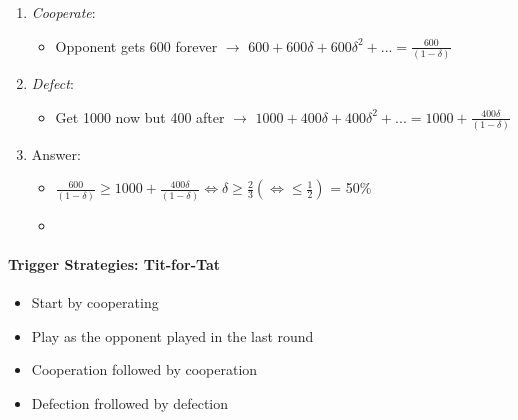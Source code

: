 \documentclass[11pt, english]{article}
\begin{document}
	\begin{enumerate}                                      
        \setlength\itemsep{0cm}
		\item \textit{Cooperate}:
		\begin{itemize}
			\item Opponent gets 600 forever $\rightarrow$ $600+600\delta+600\delta^2+...=\frac{600}{(1-\delta)}$
		\end{itemize}
		\item \textit{Defect}:
		\begin{itemize}                            
			\item Get 1000 now but 400 after $\rightarrow$ $1000+400\delta+400\delta^2+...=1000+\frac{400\delta}{(1-\delta)}$
                \end{itemize}
		\item Answer:
		\begin{itemize}                            
			\item $\frac{600}{(1-\delta)}\ge1000+\frac{400\delta}{(1-\delta)}\Leftrightarrow\delta\ge\frac{2}{3}(\Leftrightarrow\le\frac{1}{2})$ = 50\%
			\item {}
                \end{itemize}
	\end{enumerate}

		\paragraph{Trigger Strategies: Tit-for-Tat}

	\begin{itemize}
	\setlength\itemsep{0cm}                             
                \item Start by cooperating
		\item Play as the opponent played in the last round
		\item Cooperation followed by cooperation
		\item Defection frollowed by defection 
	\end{itemize}
\end{document}
